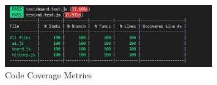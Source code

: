 \documentclass[12pt, titlepage]{article}
\begin{document}
\begin{figure}[H]
\centering
\includegraphics[width=0.8\textwidth]{CodeCoverage.png}
\caption{Code Coverage Metrics}
\label{FigUH}
\end{figure}




\end{document}

